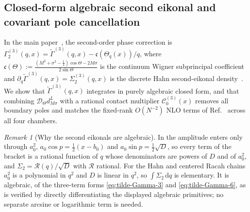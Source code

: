 \documentclass[11pt]{article}
\theoremstyle{definition}
\theoremstyle{remark}
\newtheorem{remark}[theorem]{Remark}
\newcommand{\dd}{\mathrm{d}}
\newcommand{\cD}{\mathcal{D}}
\newcommand{\cC}{\mathcal{C}}
\renewcommand{\_}{\oldunderscore\penalty0\hskip0pt\relax}
\begin{document}
\subsection{Closed-form algebraic second eikonal and covariant pole cancellation}
In the main paper~\cite[Proposition~3.15, Eqs.~(46) and~(48)]{LewisGrowingRank},
  the second-order phase correction is $\Gamma_2^{(3)}(q,x)=\widetilde{\Gamma}^{(3)}(q,x)-\mathfrak c(\Theta_q(x))/q$, where
  $\mathfrak c(\Theta):=\frac{(M^2+\sigma^2-\frac14)\cos\Theta-2M\sigma}{2\sin\Theta}$ is the continuum Wigner subprincipal coefficient
  \cite[Eq.~(25)]{LewisGrowingRank} and $\partial_q\widetilde{\Gamma}^{(3)}(q,x)=\Sigma_2^{(3)}(q,x)$ is the discrete Hahn
  second-eikonal density~\cite[Eq.~(46)]{LewisGrowingRank}. We show that $\widetilde{\Gamma}^{(3)}(q,x)$ integrates in
  purely algebraic closed form, and that combining $\cD_\Theta d^L_{M\sigma}$ with a rational contact multiplier $\cC_0^{(3)}(x)$
  removes all boundary poles and matches the fixed-rank $O(N^{-2})$ NLO terms of Ref.~\cite{LewisFixedRank} across all four chambers.

\begin{remark}[Why the second eikonals are algebraic]
\label{rem:algebraic-eikonal}
In \cite[Eq.~(46)]{LewisGrowingRank} the amplitude enters only through $a_0^2$,
  $a_0\cos p=\frac12(x-b_0)$ and $a_0\sin p=\frac12\sqrt D$, so every term of the bracket is a rational function of $q$ whose
  denominators are powers of $D$ and of $a_0^2$, and $\Sigma_2=\mathcal R(q)/\sqrt D$ with $\mathcal R$ rational. For the Hahn and
  centered Racah chains $a_0^2$ is a polynomial in $q^2$ and $D$ is linear in $q^2$, so $\int\Sigma_2\,\dd q$ is elementary. It is
  algebraic, of the three-term forms \eqref{eq:tilde-Gamma-3} and \eqref{eq:tilde-Gamma-6}, as is verified by directly
  differentiating the displayed algebraic primitives; no separate arcsine or logarithmic term is needed.
\end{remark}
\end{document}
